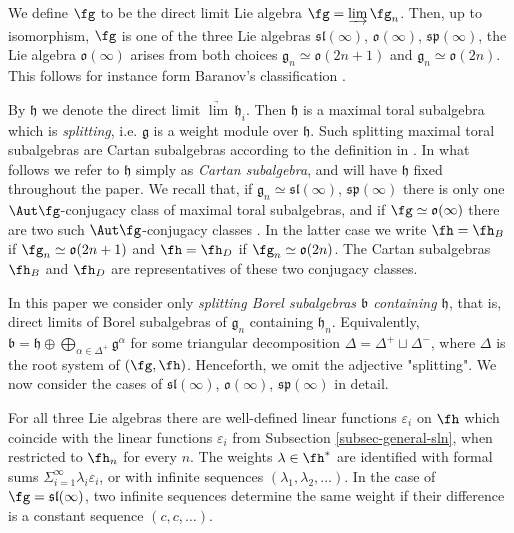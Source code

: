 \documentclass[12pt]{amsart}
\def\gb{\mathfrak{b}}
\def\gg{\mathfrak{g}}
\def\gh{\mathfrak{h}}
\def\gl{\mathfrak{l}}
\def\gs{\mathfrak{s}}
\def\gh{\mathfrak h}
\begin{document}
 We define $\fg$ to be the direct limit Lie algebra $\fg=\underrightarrow{\lim}\,\fg_n$. Then, up to isomorphism, $\fg$ is one of the three Lie algebras $\mathfrak{sl}(\infty)$, $\mathfrak{o}(\infty)$, $\mathfrak{sp}(\infty)$, the Lie algebra $\mathfrak{o}({\infty})$ arises from both choices $\mathfrak{g}_n\simeq\mathfrak{o}({2n+1})$ and $\mathfrak{g}_n\simeq\mathfrak{o}({2n})$. This follows for instance form Baranov's classification \cite{B}.

By $\gh$ we denote the direct limit $\underrightarrow\lim\, \gh_i$. Then  $\gh$ is a maximal toral subalgebra which is \emph{splitting}, i.e. $\gg$ is a weight module over $\gh$. Such splitting maximal toral subalgebras are Cartan subalgebras according to the definition in \cite{DPS}. In what follows we refer to $\gh$ simply as \emph{Cartan subalgebra}, and will have $\gh$ fixed throughout the paper. 
We recall that, if  $\mathfrak{g}_n\simeq\mathfrak{sl}({\infty}),\,\mathfrak{sp}({\infty})$ there is only one $\Aut \fg$-conjugacy class of maximal toral subalgebras, and if $\fg\simeq\mathfrak{o}({\infty})$ there are two such $\Aut \fg$-conjugacy classes \cite{DPS}.
In the latter case we write $\fh=\fh_B$ if $\fg_n\simeq\mathfrak{o}({2n+1})$ and $\fh=\fh_D$ if $\fg_n\simeq\mathfrak{o}({2n})$. The Cartan subalgebras $\fh_B$ and $\fh_D$ are representatives of these two conjugacy classes.


In this paper we consider only \emph{splitting Borel subalgebras $\gb$ containing $\gh$}, that is, direct limits of Borel subalgebras of $\gg_n$ containing $\gh_n$. Equivalently, $\gb = \gh \oplus \bigoplus_{\alpha \in \Delta^+} \gg^{\alpha}$ for some triangular decomposition $\Delta = \Delta^+ \sqcup \Delta^-$, where $\Delta$ is the root system of $(\fg,\fh)$. Henceforth, we omit the adjective "splitting". We now consider the cases of $\mathfrak{sl}(\infty)$, $\mathfrak{o}(\infty)$, $\mathfrak{sp}(\infty)$ in detail.








For all three Lie algebras  there are well-defined linear functions $\varepsilon_i$ on $\fh$ which coincide with the linear functions $\varepsilon_i$ from Subsection \ref{subsec-general-sln}, when restricted to $\fh_n$ for every $n$. The weights $\lambda\in \fh^*$ are identified with formal  sums $\Sigma_{i=1}^\infty \lambda_i \varepsilon_i$, or with infinite sequences $(\lambda_1,\lambda_2,\dots)$. In the case of $\fg=\gs\gl(\infty)$, two infinite sequences determine the same weight if their difference is a constant sequence $(c,c,\dots)$.
\end{document}
